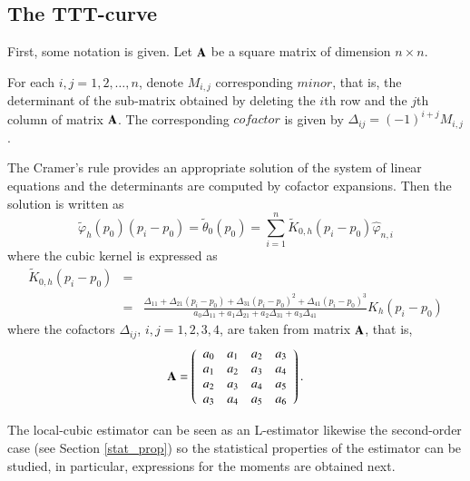 \documentclass[preprint,12pt]{elsarticle}
\begin{document}
\subsection{The TTT-curve }%

\noindent First, some notation is given. Let ${\bf A}$ be a square matrix of dimension $n \times n$. 

For each $i, j =1,2,\ldots, n$, denote $M_{i,j}$ corresponding $minor$, that is, the determinant of the sub-matrix obtained by deleting the $i$th row and the $j$th column of matrix ${\bf A}$. The corresponding $cofactor$ is given by  $\Delta_{ij}=(-1)^{i+j} M_{i,j}$. 

The Cramer's rule provides an appropriate solution of the system of linear equations and the determinants are computed by cofactor expansions. Then the solution is written as
\begin{equation}\label{phi.cub}
\widetilde{\varphi}_h(p_0)\left(p_i-p_0\right)= \widetilde{\theta}_0(p_0)=\sum_{i=1}^n \widetilde{K}_{0,h}\left(p_i-p_0\right) \widehat{\varphi}_{n,i}
\end{equation}
where the cubic kernel is expressed as
\begin{eqnarray*}
\widetilde{K}_{0,h}\left(p_i-p_0\right)&=& \\
&=&\frac{\Delta_{11}+\Delta_{21}\left(p_i-p_0 \right)+\Delta_{31}\left(p_i-p_0 \right)^2+\Delta_{41}\left(p_i-p_0 \right)^3}{a_0 \Delta_{11}+ a_1 \Delta_{21}+a_2 \Delta_{31}+a_3 \Delta_{41}} K_h\left(p_i-p_0\right)
\end{eqnarray*}
where the cofactors $\Delta_{ij}$, $i,j=1, 2, 3, 4$, are taken from matrix ${\bf A}$, that is,
\[
{\bf A} =\left(\begin{array}{cccc}
a_0 & a_1&a_2 &a_3 \\ 
a_{1} & a_2&a_3 &a_{4}\\
a_2 & a_3 &a_4 &a_5 \\ 
a_3 & a_4&a_5 &a_{6} 
\end{array}\right).
\]

\bigskip

The local-cubic estimator can be seen as an L-estimator likewise the second-order case (see Section \ref{stat_prop}) so the statistical properties of the estimator can be studied,  in particular, expressions for the moments are obtained next.
\end{document}
